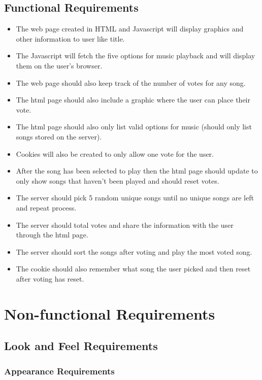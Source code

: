 \documentclass[12pt, titlepage]{article}
\begin{document}
\subsection{Functional Requirements}
\begin{itemize}
\item The web page created in HTML and Javascript will display graphics and other information to user like title.
\item The Javascript will fetch the five options for music playback and will display them on the user's browser.
\item The web page should also keep track of the number of votes for any song.
\item The html page should also include a graphic where the user can place their vote.
\item The html page should also only list valid options for music (should only list songs stored on the server).
\item Cookies will also be created to only allow one vote for the user.
\item After the song has been selected to play then the html page should update to only show songs that haven't been played and should reset votes.
\item The server should pick 5 random unique songs until no unique songs are left and repeat process.
\item The server should total votes and share the information with the user through the html page.
\item The server should sort the songs after voting and play the most voted song.
\item The cookie should also remember what song the user picked and then reset after voting has reset.
\end{itemize}

\section{Non-functional Requirements}

\subsection{Look and Feel Requirements}

\subsubsection{Appearance Requirements}
\end{document}
